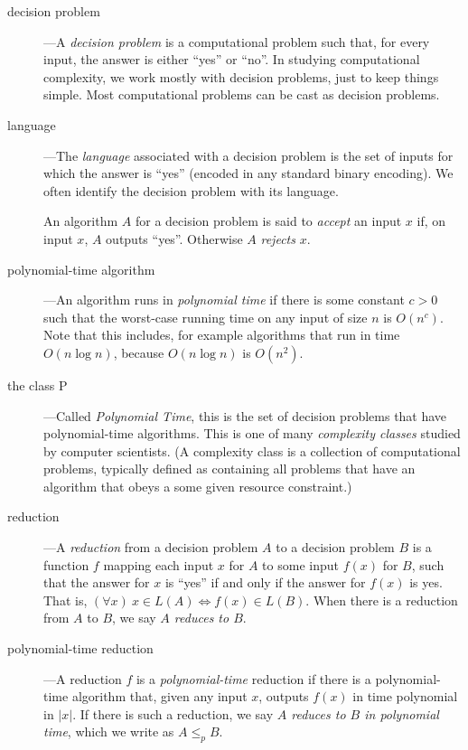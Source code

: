\documentclass[11pt]{article}
\begin{document}
\begin{description}

\item[decision problem]---A \emph{decision problem} is a computational problem such that, for every input, the answer is either ``yes'' or ``no''.
  In studying computational complexity, we work mostly with decision problems, just to keep things simple.
  Most computational problems can be cast as decision problems.
  
\item[language]---The \emph{language} associated with a decision problem is the set of inputs for which the answer is ``yes'' (encoded in any standard binary encoding).  We often identify the decision problem with its language.

  An algorithm $A$ for a decision problem is said to \emph{accept} an input $x$ if, on input $x$, $A$ outputs ``yes''.  Otherwise $A$ \emph{rejects} $x$.

\item[polynomial-time algorithm]---An algorithm runs in \emph{polynomial time} if there is some constant $c>0$ such that the worst-case running time on any input of size $n$ is $O(n^c)$.  Note that this includes, for example algorithms that run in time $O(n\log n)$, because $O(n\log n)$ is $O(n^2)$.

\item[the class P]---Called \emph{Polynomial Time}, this is the set of decision problems that have polynomial-time algorithms.  This is one of many \emph{complexity classes} studied by computer scientists.  (A complexity class is a collection of computational problems, typically defined as containing all problems that have an algorithm that obeys a some given resource constraint.)

\item[reduction]---A \emph{reduction} from a decision problem $A$ to a decision problem $B$ is a function $f$ mapping each input $x$ for $A$ to some input $f(x)$ for $B$, such that the answer for $x$ is ``yes'' if and only if the answer for $f(x)$ is yes.  That is, $(\forall x)~x\in L(A) \iff f(x)\in L(B)$.  When there is a reduction from $A$ to $B$,
  we say \emph{$A$ reduces to $B$}.
  
\item[polynomial-time reduction]---A reduction $f$ is a \emph{polynomial-time} reduction if there is a polynomial-time algorithm that, given any input $x$, outputs $f(x)$ in time polynomial in $|x|$.  If there is such a reduction,
  we say \emph{$A$ reduces to $B$ in polynomial time}, which we write as $A\le_p B$.
\end{description}
\end{document}
